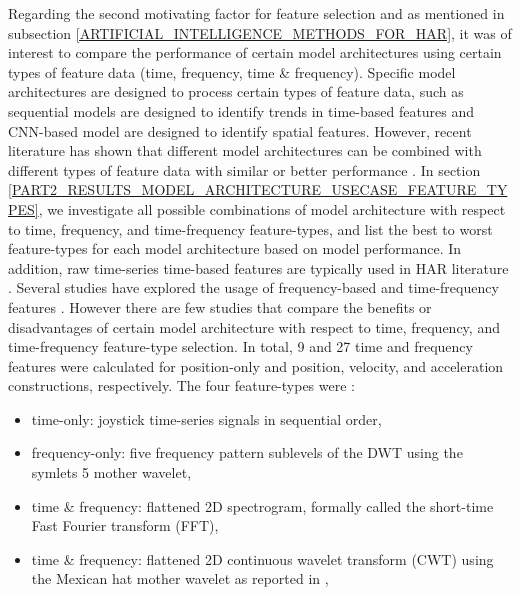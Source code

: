 \documentclass{ieeeaccess}
\begin{document}
Regarding the second motivating factor for feature selection and as mentioned in subsection \ref{ARTIFICIAL_INTELLIGENCE_METHODS_FOR_HAR}, it was of interest to compare the performance of certain model architectures using certain types of feature data (time, frequency, time \& frequency). Specific model architectures are designed to process certain types of feature data, such as sequential models are designed to identify trends in time-based features and CNN-based model are designed to identify spatial features. However, recent literature has shown that different model architectures can be combined with different types of feature data with similar or better performance \cite{}. In section \ref{PART2_RESULTS_MODEL_ARCHITECTURE_USECASE_FEATURE_TYPES}, we investigate all possible combinations of model architecture with respect to time, frequency, and time-frequency feature-types, and list the best to worst feature-types for each model architecture based on model performance. In addition, raw time-series time-based features are typically used in HAR literature \cite{}. Several studies have explored the usage of frequency-based and time-frequency features \cite{Nedorubova_2021_CWT_CNN_HumanActivity}. However there are few studies that compare the benefits or disadvantages of certain model architecture with respect to time, frequency, and time-frequency feature-type selection. In total, 9 and 27 time and frequency features were calculated for position-only and position, velocity, and acceleration constructions, respectively. The four feature-types were :
\begin{itemize}
\item time-only: joystick time-series signals in sequential order,
\item frequency-only: five frequency pattern sublevels of the DWT using the symlets 5 mother wavelet\cite{Nedorubova_2021_CWT_CNN_HumanActivity},
\item time \& frequency: flattened 2D spectrogram, formally called the short-time Fast Fourier transform (FFT),
\item time \& frequency: flattened 2D continuous wavelet transform (CWT) using the Mexican hat mother wavelet as reported in \cite{Nedorubova_2021_CWT_CNN_HumanActivity},
\end{itemize}
\end{document}

